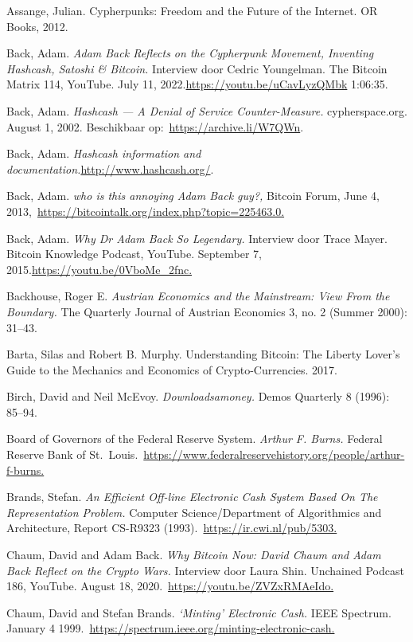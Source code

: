 \documentclass[smalldemyvopaper,11pt,twoside,onecolumn,openright,extrafontsizes,hidelinks]{memoir}
\begin{document}
Assange, Julian. Cypherpunks: Freedom and the Future of the Internet. OR
Books, 2012.

Back, Adam. \emph{Adam Back Reflects on the Cypherpunk Movement,
Inventing Hashcash, Satoshi \& Bitcoin.} Interview door Cedric
Youngelman. The Bitcoin Matrix 114, YouTube. July 11,
2022.\url{https://youtu.be/uCavLyzQMbk} 1:06:35.

Back, Adam. \emph{Hashcash --- A Denial of Service Counter-Measure.}
cypherspace.org. August 1, 2002. Beschikbaar
op:~\url{https://archive.li/W7QWn}.

Back, Adam. \emph{Hashcash information and
documentation.}\url{http://www.hashcash.org/}.

Back, Adam. \emph{who is this annoying Adam Back guy?,} Bitcoin Forum,
June 4,
2013,~\href{https://bitcointalk.org/index.php?topic=225463.0}{https://bitcointalk.org/index.php?topic=225463.0.}

Back, Adam. \emph{Why Dr Adam Back So Legendary.} Interview door Trace
Mayer. Bitcoin Knowledge Podcast, YouTube. September 7,
2015.\href{https://youtu.be/0VboMe_2fnc}{https://youtu.be/0VboMe\_2fnc.}

Backhouse, Roger E. \emph{Austrian Economics and the Mainstream: View
From the Boundary.} The Quarterly Journal of Austrian Economics 3, no. 2
(Summer 2000): 31--43.

Barta, Silas and Robert B. Murphy. Understanding Bitcoin: The Liberty
Lover's Guide to the Mechanics and Economics of Crypto-Currencies. 2017.

Birch, David and Neil McEvoy. \emph{Downloadsamoney.} Demos Quarterly 8
(1996): 85--94.

Board of Governors of the Federal Reserve System. \emph{Arthur F.
Burns.} Federal Reserve Bank of
St.~Louis.~\url{https://www.federalreservehistory.org/people/arthur-f-burns.}

Brands, Stefan. \emph{An Efficient Off-line Electronic Cash System Based
On The Representation Problem.} Computer Science/Department of
Algorithmics and Architecture, Report CS-R9323
(1993).~\href{https://ir.cwi.nl/pub/5303}{https://ir.cwi.nl/pub/5303.}

Chaum, David and Adam Back. \emph{Why Bitcoin Now: David Chaum and Adam
Back Reflect on the Crypto Wars.} Interview door Laura Shin. Unchained
Podcast 186, YouTube. August 18,
2020.~\href{https://youtu.be/ZVZxRMAeIdo}{https://youtu.be/ZVZxRMAeIdo.}

Chaum, David and Stefan Brands. \emph{`Minting' Electronic Cash.} IEEE
Spectrum. January 4
1999.~\href{https://spectrum.ieee.org/minting-electronic-cash}{https://spectrum.ieee.org/minting-electronic-cash.}
\end{document}
